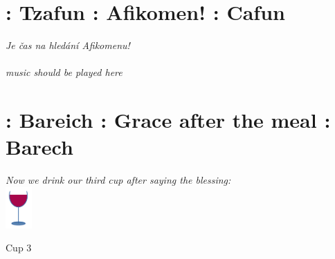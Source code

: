 \documentclass[a5paper,10pt]{memoir}
\begin{document}
\section{ : Tzafun : Afikomen! : Cafun}
\textit{\color{black} Je čas na hledání Afikomenu!\\}
\\ 
\textit{music should be played here}

\section{ : Bareich : Grace after the meal : Barech}
\Bareich 
\onecolumn
\textit{\color{midblue} Now we drink our third cup after saying the blessing:}\\
\color{black}
\vspace*{1ex}
\hfill\includegraphics[width=10mm]{cup}
\vspace*{-15ex}  %

\begin{center}
	\noindent \large \color{midblue} Cup 3
\end{center}
\Kaddeish
\end{document}
